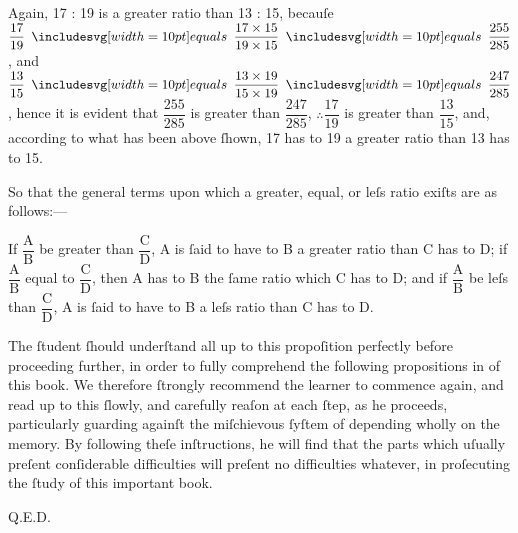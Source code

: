 \documentclass[12pt,preview]{standalone}
\begin{document}
\begin{minipage}{\textwidth}
    \hfill

    Again, 17 : 19 is a greater ratio than 13 : 15, becauſe $\dfrac{\text{17}}{\text{19}} \bequals \dfrac{\text{17} \times \text{15}}{\text{19} \times \text{15}} \bequals \dfrac{\text{255}}{\text{285}}$, and $\dfrac{\text{13}}{\text{15}} \bequals \dfrac{\text{13} \times \text{19}}{\text{15} \times \text{19}} \bequals \dfrac{\text{247}}{\text{285}}$, hence it is evident that $\dfrac{\text{255}}{\text{285}}$ is greater than $\dfrac{\text{247}}{\text{285}}$, $\therefore \dfrac{\text{17}}{\text{19}}$ is greater than $\dfrac{\text{13}}{\text{15}}$, and, according to what has been above ſhown, 17 has to 19 a greater ratio than 13 has to 15.\\

    \hfill

    So that the general terms upon which a greater, equal, or leſs ratio exiſts are as follows:---\\

    \hfill

    If $\dfrac{\text{A}}{\text{B}}$ be greater than $\dfrac{\text{C}}{\text{D}}$, A is ſaid to have to B a greater ratio than C has to D; if $\dfrac{\text{A}}{\text{B}}$ equal to $\dfrac{\text{C}}{\text{D}}$, then A has to B the ſame ratio which C has to D; and if $\dfrac{\text{A}}{\text{B}}$ be leſs than $\dfrac{\text{C}}{\text{D}}$, A is ſaid to have to B a leſs ratio than C has to D.\\
\end{minipage}

\newpage

\begin{minipage}{\textwidth}
    The ſtudent ſhould underſtand all up to this propoſition perfectly before proceeding further, in order to fully comprehend the following propositions in of this book. We therefore ſtrongly recommend the learner to commence again, and read up to this ſlowly, and carefully reaſon at each ſtep, as he proceeds, particularly guarding againſt the miſchievous ſyſtem of depending wholly on the memory. By following theſe inſtructions, he will find that the parts which uſually preſent conſiderable difficulties will preſent no difficulties whatever, in proſecuting the ſtudy of this important book.

    \hfill

    \hfill Q.E.D.
\end{minipage}
\end{document}
